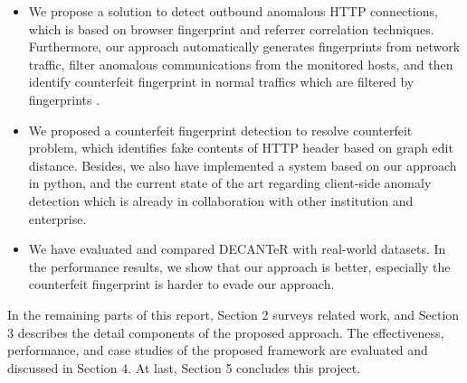 \begin{itemize}

\item We propose a solution to detect outbound anomalous HTTP connections, which is based on browser fingerprint and referrer correlation techniques. Furthermore, our approach automatically generates  fingerprints from network traffic, filter anomalous communications from the monitored hosts, and then identify counterfeit fingerprint in normal traffics which are filtered by fingerprints \cite{bortolameotti2017decanter}.

\item We proposed a counterfeit fingerprint detection to resolve counterfeit problem, which identifies fake contents of HTTP header based on graph edit distance. Besides, we also have implemented a system based on our approach in python, and the current state of the art regarding client-side anomaly detection which is already in collaboration with other institution and enterprise. 

\item We have evaluated and compared DECANTeR \cite{bortolameotti2017decanter} with real-world datasets. In the performance results, we show that our approach is better, especially the counterfeit fingerprint is harder to evade our approach.

\end{itemize}

In the remaining parts of this report, Section 2 surveys related work, and Section 3 describes the detail components of the proposed approach. The effectiveness, performance, and case studies of the proposed framework are evaluated and discussed in Section 4. At last, Section 5 concludes this project.
